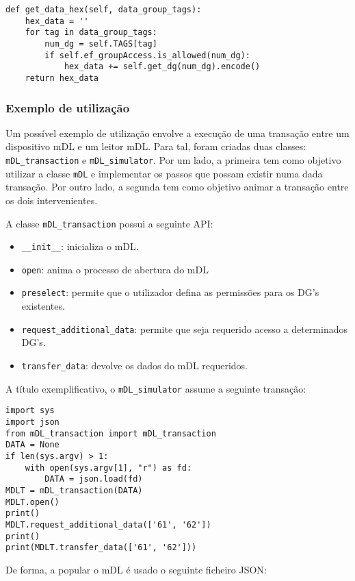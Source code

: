 \begin{Verbatim}[frame=single, framerule=0.5mm]
def get_data_hex(self, data_group_tags):
	hex_data = ''
	for tag in data_group_tags:
		num_dg = self.TAGS[tag]
		if self.ef_groupAccess.is_allowed(num_dg):
			hex_data += self.get_dg(num_dg).encode()
	return hex_data
\end{Verbatim}


\subsubsection{Exemplo de utilização}

Um possível exemplo de utilização envolve a execução de uma transação entre um dispositivo mDL e um leitor mDL\@. Para tal, foram criadas duas classes: \texttt{mDL\_transaction} e \texttt{mDL\_simulator}. Por um lado, a primeira tem como objetivo utilizar a classe \texttt{mDL} e implementar os passos que possam existir numa dada transação. Por outro lado, a segunda tem como objetivo animar a transação entre os dois intervenientes.

A classe \texttt{mDL\_transaction} possui a seguinte API:

\begin{itemize}
	\item \texttt{\_\_init\_\_}: inicializa o mDL.
	\item \texttt{open}: anima o processo de abertura do mDL
	\item \texttt{preselect}: permite que o utilizador defina as permissões para os DG's existentes.
	\item \texttt{request\_additional\_data}: permite que seja requerido acesso a determinados DG's.
	\item \texttt{transfer\_data}: devolve os dados do mDL requeridos.
\end{itemize}

A título exemplificativo, o \texttt{mDL\_simulator} assume a seguinte transação:

\begin{Verbatim}[frame=single, framerule=0.5mm]
import sys
import json
from mDL_transaction import mDL_transaction
DATA = None
if len(sys.argv) > 1:
    with open(sys.argv[1], "r") as fd:
        DATA = json.load(fd)
MDLT = mDL_transaction(DATA)
MDLT.open()
print()
MDLT.request_additional_data(['61', '62'])
print()
print(MDLT.transfer_data(['61', '62']))
\end{Verbatim}

De forma, a popular o mDL é usado o seguinte ficheiro JSON:

